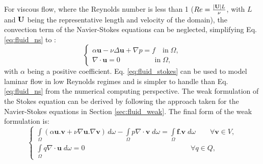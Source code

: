 For viscous flow, where the Reynolds number is less than 1 ($Re = {|{\bf U}|L \over \nu}$, with $L$ and $\bf U$ being the representative length and velocity of the domain), the convection term of the Navier-Stokes equations can be neglected, simplifying Eq. \ref{eq:fluid_ns} to \cite{Quarteroni2014}:
\begin{equation} \label{eq:fluid_stokes}
\left\{ {\begin{array}{*{20}{l}}
\displaystyle  {\alpha \mathbf{u} - \nu\Delta \mathbf{u} + \nabla p = f\quad \text{in}\;\Omega ,} \\
\displaystyle  {\nabla\cdot\mathbf{u} = 0\quad \quad \quad \quad \;\;\;\text{in}\;\Omega ,}
\end{array}} \right.
\end{equation}
with $\alpha$ being a positive coefficient. Eq. \ref{eq:fluid_stokes} can be used to model laminar flow in low Reynolds regimes and is simpler to handle than Eq. \ref{eq:fluid_ns} from the numerical computing perspective. The weak formulation of the Stokes equation can be derived by following the approach taken for the Navier-Stokes equations in Section \ref{sec:fluid_weak}. The final form of the weak formulation is:
\begin{equation} \label{eq:fluid_stokes_weak}
\left\{ {\begin{array}{*{20}{l}}
\displaystyle  {\int\limits_\Omega  {(\alpha {\mathbf{u}}.{\mathbf{v}} + \nu\nabla {\mathbf{u}}.\nabla {\mathbf{v}})\,} d\omega  - \int\limits_\Omega  {p\nabla\cdot{\mathbf{v}}\;d\omega  = } \int\limits_\Omega  {{\mathbf{f}}.{\mathbf{v}}\;d\omega \qquad {\forall {\mathbf{v}}} \in V,} } \\
\displaystyle  {\int\limits_\Omega  {q\nabla\cdot{\mathbf{u}}\;d\omega  = 0} \qquad \qquad \qquad \qquad \qquad \qquad \qquad \;\;\;{\forall {{q}}} \in Q,}
\end{array}} \right.
\end{equation}

